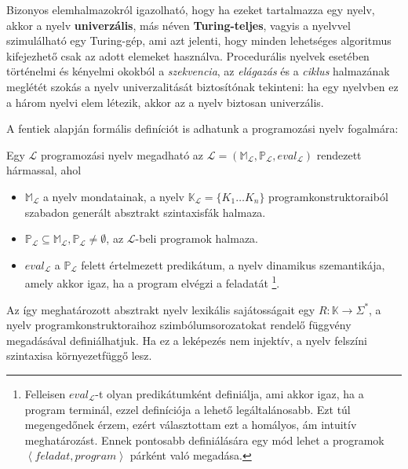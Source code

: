 Bizonyos elemhalmazokról igazolható, hogy ha ezeket tartalmazza egy nyelv, akkor a nyelv \textbf{univerzális}, más néven \textbf{Turing-teljes}, vagyis a nyelvvel szimulálható egy Turing-gép, ami azt jelenti, hogy minden lehetséges algoritmus kifejezhető csak az adott elemeket használva.
Procedurális nyelvek esetében történelmi és kényelmi okokból a \textit{szekvencia}, az \textit{elágazás} és a \textit{ciklus} halmazának meglétét szokás a nyelv univerzalitását biztosítónak tekinteni: ha egy nyelvben ez a három nyelvi elem létezik, akkor az a nyelv biztosan univerzális\cite{Fothi}.

\bigskip

\noindent A fentiek alapján formális definíciót is adhatunk a programozási nyelv fogalmára:
\begin{defn}
	Egy $\mathcal{L}$ programozási nyelv megadható az $\mathcal{L} = (
		\mathbb{M}_\mathcal{L},
		\mathbb{P}_\mathcal{L},
		eval_\mathcal{L}
	)$ rendezett hármassal, ahol
	\begin{itemize}
		\item $\mathbb{M}_\mathcal{L}$ a nyelv mondatainak, a nyelv $\mathbb{K}_\mathcal{L} = \{K_1 \ldots K_n\}$ programkonstruktoraiból szabadon generált absztrakt szintaxisfák halmaza.
		\item $\mathbb{P}_\mathcal{L} \subseteq \mathbb{M}_\mathcal{L}, \mathbb{P}_\mathcal{L} \not= \emptyset$, az $\mathcal{L}$-beli programok halmaza.
		\item $eval_{\mathcal{L}}$ a $\mathbb{P}_\mathcal{L}$ felett értelmezett predikátum, a nyelv dinamikus szemantikája, amely akkor igaz, ha a program elvégzi a feladatát%
		\footnote{
Felleisen $eval_\mathcal{L}$-t olyan predikátumként definiálja, ami akkor igaz, ha a program terminál\cite{Felleisen90}, ezzel  definíciója a lehető legáltalánosabb. Ezt túl megengedőnek érzem, ezért választottam ezt a homályos, ám intuitív meghatározást. Ennek pontosabb definiálására egy mód lehet a programok $\left<feladat, program\right>$ párként való megadása.
		}.
	\end{itemize}

	\normalfont Az így meghatározott absztrakt nyelv lexikális sajátosságait egy $R: \mathbb{K} \rightarrow \Sigma^*$, a nyelv programkonstruktoraihoz szimbólumsorozatokat rendelő függvény megadásával definiálhatjuk. Ha ez a leképezés nem injektív, a nyelv felszíni szintaxisa környezetfüggő lesz.
\end{defn}

